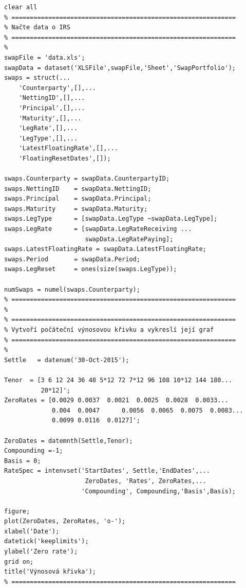 \documentclass[a4paper,12pt]{report}
\theoremstyle{definition} \newtheorem{definice}[veta]{Definice}
\theoremstyle{remark}
\begin{document}
\begin{verbatim}
clear all
% =============================================================
% Načte data o IRS
% =============================================================
%
swapFile = 'data.xls';
swapData = dataset('XLSFile',swapFile,'Sheet','SwapPortfolio');
swaps = struct(...
    'Counterparty',[],...
    'NettingID',[],...
    'Principal',[],...
    'Maturity',[],...
    'LegRate',[],...
    'LegType',[],...
    'LatestFloatingRate',[],...
    'FloatingResetDates',[]);

swaps.Counterparty = swapData.CounterpartyID;
swaps.NettingID    = swapData.NettingID;
swaps.Principal    = swapData.Principal;
swaps.Maturity     = swapData.Maturity;
swaps.LegType      = [swapData.LegType ~swapData.LegType];
swaps.LegRate      = [swapData.LegRateReceiving ... 
                      swapData.LegRatePaying];
swaps.LatestFloatingRate = swapData.LatestFloatingRate;
swaps.Period       = swapData.Period;
swaps.LegReset     = ones(size(swaps.LegType));

numSwaps = numel(swaps.Counterparty);
% =============================================================
%
% =============================================================
% Vytvoří počáteční výnosovou křivku a vykreslí její graf
% =============================================================
%
Settle   = datenum('30-Oct-2015');

Tenor  = [3 6 12 24 36 48 5*12 72 7*12 96 108 10*12 144 180... 
          20*12]';
ZeroRates = [0.0029	0.0037	0.0021	0.0025	0.0028	0.0033...	
             0.004	0.0047		0.0056	0.0065	0.0075	0.0083...
             0.0099	0.0116	0.0127]';

ZeroDates = datemnth(Settle,Tenor);
Compounding =-1;
Basis = 0;
RateSpec = intenvset('StartDates', Settle,'EndDates',... 
                      ZeroDates, 'Rates', ZeroRates,...
                     'Compounding', Compounding,'Basis',Basis);

figure;
plot(ZeroDates, ZeroRates, 'o-');
xlabel('Date');
datetick('keeplimits');
ylabel('Zero rate');
grid on;
title('Výnosová křivka');
% =============================================================
\end{verbatim}
\end{document}
